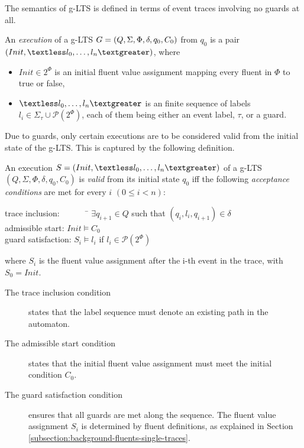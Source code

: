 The semantics of g-LTS is defined in terms of event traces involving no guards at all.

\begin{definition}
An \emph{execution} of a g-LTS $G = (Q,\Sigma,\Phi,\\\delta,q_{0},C_{0})$ from $q_0$ is a pair $(Init, \textless l_0, \ldots,l_n\textgreater)$, where 
\begin{itemize}
\item $Init \in 2^\Phi$ is an initial fluent value assignment mapping every fluent in $\Phi$ to true or false,
\item $\textless l_0,\ldots,l_n \textgreater$ is an finite sequence of labels $l_i \in \Sigma_{\tau}\cup\mathcal{P}(2^\Phi)$, each of them being either an event label, $\tau$, or a guard.
\end{itemize}
\end{definition}

Due to guards, only certain executions are to be considered valid from the initial state of the g-LTS. This is captured by the following definition.

\begin{definition}
An execution $S = (Init,\textless l_0,\ldots,\\l_n \textgreater)$ of a g-LTS $(Q,\Sigma,\Phi,\delta,q_{0},C_{0})$ is \emph{valid} from its initial state $q_0$ iff the following \emph{acceptance conditions} are met for every $i$ $(0 \leqslant i < n)$:\\
\vspace{-0.8cm}
\begin{tabbing}
\indent trace inclusion:~~~~~~~\= $\exists q_{i+1} \in Q$ such that $(q_i,l_i,q_{i+1}) \in \delta$\\
\indent admissible start:      \> $Init \models C_0$ \\
\indent guard satisfaction:    \> $S_i \models l_i$ if $l_i \in \mathcal{P}(2^\Phi)$\\
\end{tabbing}
\vspace{-0.8cm}
where $S_i$ is the fluent value assignment after the i-th event in the trace, with $S_0 = Init$.
\label{definition:valid-glts-execution}
\end{definition}

\begin{description}
\item[The trace inclusion condition] states that the label sequence must denote an existing path in the automaton.
\item[The admissible start condition] states that the initial fluent value assignment must meet the initial condition $C_0$.
\item[The guard satisfaction condition] ensures that all guards are met along the sequence. The fluent value assignment $S_i$ is determined by fluent definitions, as explained in Section \ref{subsection:background-fluents-single-traces}. 
\end{description}

